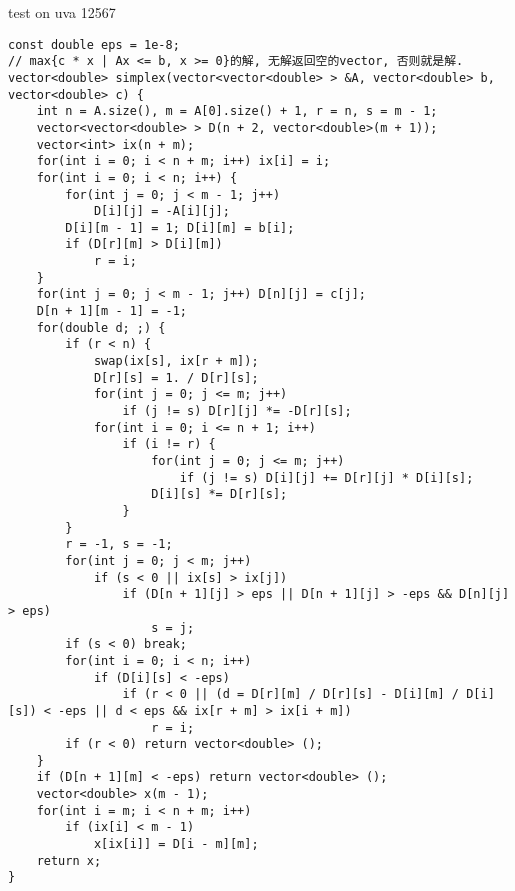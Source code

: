 test on uva 12567
\begin{lstlisting}
const double eps = 1e-8;
// max{c * x | Ax <= b, x >= 0}的解, 无解返回空的vector, 否则就是解. 
vector<double> simplex(vector<vector<double> > &A, vector<double> b, vector<double> c) {
	int n = A.size(), m = A[0].size() + 1, r = n, s = m - 1;
	vector<vector<double> > D(n + 2, vector<double>(m + 1));
	vector<int> ix(n + m);
	for(int i = 0; i < n + m; i++) ix[i] = i;
	for(int i = 0; i < n; i++) {
		for(int j = 0; j < m - 1; j++)
			D[i][j] = -A[i][j];
		D[i][m - 1] = 1; D[i][m] = b[i];
		if (D[r][m] > D[i][m])
			r = i;
	}
	for(int j = 0; j < m - 1; j++) D[n][j] = c[j];
	D[n + 1][m - 1] = -1;
	for(double d; ;) {
		if (r < n) {
			swap(ix[s], ix[r + m]);
			D[r][s] = 1. / D[r][s];
			for(int j = 0; j <= m; j++)
				if (j != s) D[r][j] *= -D[r][s];
			for(int i = 0; i <= n + 1; i++)
				if (i != r) {
					for(int j = 0; j <= m; j++)
						if (j != s) D[i][j] += D[r][j] * D[i][s];
					D[i][s] *= D[r][s];
				}
		}
		r = -1, s = -1;
		for(int j = 0; j < m; j++)
			if (s < 0 || ix[s] > ix[j])
				if (D[n + 1][j] > eps || D[n + 1][j] > -eps && D[n][j] > eps)
					s = j;
		if (s < 0) break;
		for(int i = 0; i < n; i++)
			if (D[i][s] < -eps)
				if (r < 0 || (d = D[r][m] / D[r][s] - D[i][m] / D[i][s]) < -eps || d < eps && ix[r + m] > ix[i + m])
					r = i;
		if (r < 0) return vector<double> ();
	}
	if (D[n + 1][m] < -eps) return vector<double> ();
	vector<double> x(m - 1);
	for(int i = m; i < n + m; i++)
		if (ix[i] < m - 1)
			x[ix[i]] = D[i - m][m];
	return x;
}
\end{lstlisting}